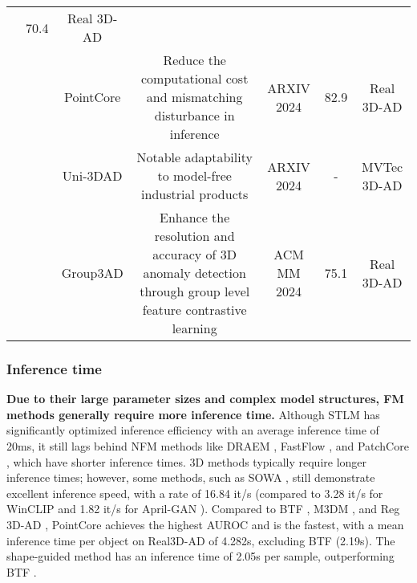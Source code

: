 \documentclass[journal,comsoc]{IEEEtran}
\begin{document}
\begin{table*}
{\begin{tabular}{c|c|c|c|c|c|c}
&70.4 
 &Real 3D-AD
\\
 & & PointCore \cite{zhao2024pointcore}
& Reduce the computational cost and mismatching disturbance
in inference& ARXIV 2024
&82.9 
 &Real 3D-AD
\\
 & & Uni-3DAD \cite{liu2024uni}
& Notable adaptability to model-free industrial
products& ARXIV 2024
&-
 &MVTec 3D-AD\\
 & & Group3AD \cite{zhu2024group3ad}
 & Enhance the
resolution and accuracy of 3D anomaly detection through group level feature contrastive learning& ACM MM 2024&75.1 &Real 3D-AD\\ 
\hline
\end{tabular}
}
\label{tab:booktabs}
\end{table*}

\subsubsection{Inference time}
\textbf{Due to their large parameter sizes and complex model structures, FM methods generally require more inference time.} Although STLM \cite{li2024sam} has significantly optimized inference efficiency with an average inference time of 20ms, it still lags behind NFM methods like DRAEM \cite{zavrtanik2021draem}, FastFlow \cite{yu2021fastflow}, and PatchCore \cite{roth2022towards}, which have shorter inference times. 3D methods typically require longer inference times; however, some methods, such as SOWA \cite{hu2024sowa}, still demonstrate excellent inference speed, with a rate of 16.84 it/s (compared to 3.28 it/s for WinCLIP \cite{jeong2023winclip} and 1.82 it/s for April-GAN \cite{chen2023april}). Compared to BTF \cite{horwitz2023back}, M3DM \cite{wang2023multimodal}, and Reg 3D-AD \cite{liu2024real3d}, PointCore \cite{zhao2024pointcore} achieves the highest AUROC and is the fastest, with a mean inference time per object on Real3D-AD \cite{liu2024real3d} of 4.282s, excluding BTF \cite{horwitz2023back}(2.19s). The shape-guided \cite{chu2023shape} method has an inference time of 2.05s per sample, outperforming BTF \cite{horwitz2023back}.
\end{document}
